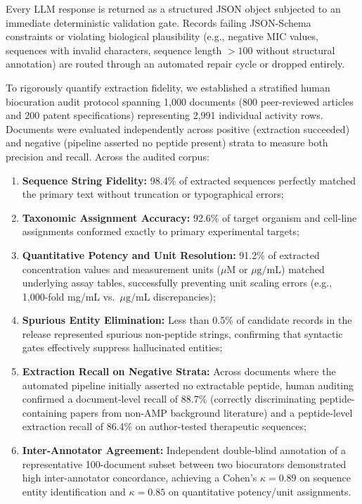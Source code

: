 \documentclass[unnumsec,webpdf,contemporary,large]{oup-authoring-template}%
\begin{document}
Every LLM response is returned as a structured JSON object subjected to an immediate deterministic validation gate. Records failing JSON-Schema constraints or violating biological plausibility (e.g., negative MIC values, sequences with invalid characters, sequence length $>100$ without structural annotation) are routed through an automated repair cycle or dropped entirely. 

To rigorously quantify extraction fidelity, we established a stratified human biocuration audit protocol spanning 1,000 documents (800 peer-reviewed articles and 200 patent specifications) representing 2,991 individual activity rows. Documents were evaluated independently across positive (extraction succeeded) and negative (pipeline asserted no peptide present) strata to measure both precision and recall. Across the audited corpus:
\begin{enumerate}
    \item \textbf{Sequence String Fidelity:} 98.4\% of extracted sequences perfectly matched the primary text without truncation or typographical errors;
    \item \textbf{Taxonomic Assignment Accuracy:} 92.6\% of target organism and cell-line assignments conformed exactly to primary experimental targets;
    \item \textbf{Quantitative Potency and Unit Resolution:} 91.2\% of extracted concentration values and measurement units ($\mu\text{M}$ or $\mu\text{g/mL}$) matched underlying assay tables, successfully preventing unit scaling errors (e.g., 1,000-fold mg/mL vs.\ $\mu\text{g/mL}$ discrepancies);
    \item \textbf{Spurious Entity Elimination:} Less than 0.5\% of candidate records in the release represented spurious non-peptide strings, confirming that syntactic gates effectively suppress hallucinated entities;
    \item \textbf{Extraction Recall on Negative Strata:} Across documents where the automated pipeline initially asserted no extractable peptide, human auditing confirmed a document-level recall of 88.7\% (correctly discriminating peptide-containing papers from non-AMP background literature) and a peptide-level extraction recall of 86.4\% on author-tested therapeutic sequences;
    \item \textbf{Inter-Annotator Agreement:} Independent double-blind annotation of a representative 100-document subset between two biocurators demonstrated high inter-annotator concordance, achieving a Cohen's $\kappa = 0.89$ on sequence entity identification and $\kappa = 0.85$ on quantitative potency/unit assignments.
\end{enumerate}
\end{document}
